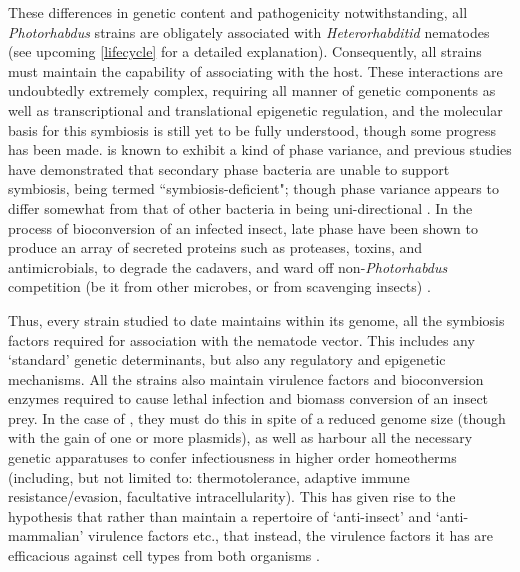 These differences in genetic content and pathogenicity notwithstanding, all \emph{Photorhabdus} strains are obligately associated with \emph{Heterorhabditid} nematodes (see upcoming \vref{lifecycle} for a detailed explanation). Consequently, all strains must maintain the capability of associating with the host. These interactions are undoubtedly extremely complex, requiring all manner of genetic components as well as transcriptional and translational epigenetic regulation, and the molecular basis for this symbiosis is still yet to be fully understood, though some progress has been made. \Pa{} is known to exhibit a kind of phase variance, and previous studies have demonstrated that secondary phase bacteria are unable to support symbiosis, being termed ``symbiosis-deficient"; though \Pa{} phase variance appears to differ somewhat from that of other bacteria in being uni-directional \citep{Ffrench-Constant2003}. In the process of bioconversion of an infected insect, late phase \Pa{} have been shown to produce an array of secreted proteins such as proteases, toxins, and antimicrobials, to degrade the cadavers, and ward off non-\emph{Photorhabdus} competition (be it from other microbes, or from scavenging insects) \citep{Daborn2001a,Baur1998}. 

Thus, every \Pa{} strain studied to date maintains within its genome, all the symbiosis factors required for association with the nematode vector. This includes any `standard' genetic determinants, but also any regulatory and epigenetic mechanisms. All the strains also maintain virulence factors and bioconversion enzymes required to cause lethal infection and biomass conversion of an insect prey. In the case of \Pasy, they must do this in spite of a reduced genome size (though with the gain of one or more plasmids), as well as harbour all the necessary genetic apparatuses to confer infectiousness in higher order homeotherms (including, but not limited to: thermotolerance, adaptive immune resistance/evasion, facultative intracellularity). This has given rise to the hypothesis that rather than maintain a repertoire of `anti-insect' and `anti-mammalian' virulence factors etc., that instead, the virulence factors it has are efficacious against cell types from both organisms \citep{Waterfield2004a}.

